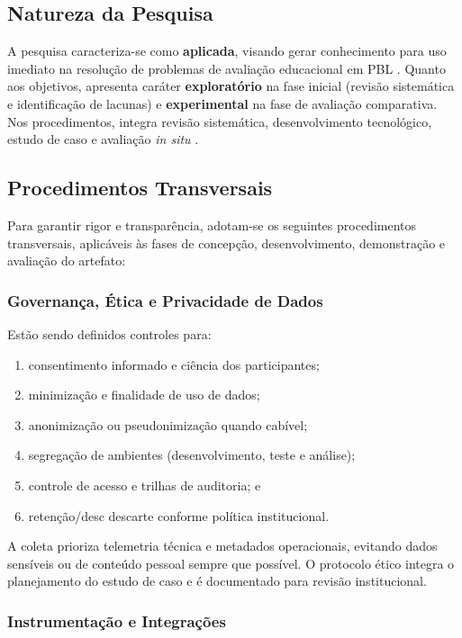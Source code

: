 \documentclass[12pt,a4paper]{article}
\begin{document}
\subsection{Natureza da Pesquisa}

A pesquisa caracteriza-se como \textbf{aplicada}, visando gerar conhecimento
para uso imediato na resolução de problemas de avaliação educacional em PBL
\cite{gil91}. Quanto aos objetivos, apresenta caráter \textbf{exploratório} na
fase inicial (revisão sistemática e identificação de lacunas) e
\textbf{experimental} na fase de avaliação comparativa. Nos procedimentos,
integra revisão sistemática, desenvolvimento tecnológico, estudo de caso e
avaliação \textit{in situ} \cite{andrade99, peffers2007design, wieringa2014design}.

\subsection{Procedimentos Transversais}

Para garantir rigor e transparência, adotam-se os seguintes procedimentos
transversais, aplicáveis às fases de concepção, desenvolvimento, demonstração e
avaliação do artefato:

\subsubsection{Governança, Ética e Privacidade de Dados}

Estão sendo definidos controles para:
\begin{enumerate}
  \item consentimento informado e ciência dos participantes;
  \item minimização e finalidade de uso de dados;
  \item anonimização ou pseudonimização quando cabível;
  \item segregação de ambientes (desenvolvimento, teste e análise);
  \item controle de acesso e trilhas de auditoria; e
  \item retenção/desc descarte conforme política institucional.
\end{enumerate}
A coleta prioriza
telemetria técnica e metadados operacionais, evitando dados sensíveis ou de
conteúdo pessoal sempre que possível. O protocolo ético integra o planejamento
do estudo de caso e é documentado para revisão institucional.

\subsubsection{Instrumentação e Integrações}
\end{document}
